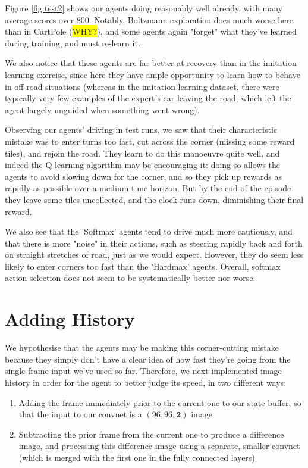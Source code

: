 \documentclass[a4paper, 11pt, conference]{ieeeconf}      %
\begin{document}
Figure \ref{fig:test2} shows our agents doing reasonably well already, with many average scores over 800. Notably, Boltzmann exploration does much worse here than in CartPole (\colorbox{yellow}{WHY?}), and some agents again "forget" what they've learned during training, and must re-learn it.

We also notice that these agents are far better at recovery than in the imitation learning exercise, since here they have ample opportunity to learn how to behave in off-road situations (whereas in the imitation learning dataset, there were typically very few examples of the expert's car leaving the road, which left the agent largely unguided when something went wrong).

Observing our agents' driving in test runs, we saw that their characteristic mistake was to enter turns too fast, cut across the corner (missing some reward tiles), and rejoin the road. They learn to do this manoeuvre quite well, and indeed the Q learning algorithm may be encouraging it: doing so allows the agents to avoid slowing down for the corner, and so they pick up rewards as rapidly as possible over a medium time horizon. But by the end of the episode they leave some tiles uncollected, and the clock runs down, diminishing their final reward.

We also see that the 'Softmax' agents tend to drive much more cautiously, and that there is more "noise" in their actions, such as steering rapidly back and forth on straight stretches of road, just as we would expect. However, they do seem less likely to enter corners too fast than the 'Hardmax' agents. Overall, softmax action selection does not seem to be systematically better nor worse.

\section{Adding History}

We hypothesise that the agents may be making this corner-cutting mistake because they simply don't have a clear idea of how fast they're going from the single-frame input we've used so far. Therefore, we next implemented image history in order for the agent to better judge its speed, in two different ways:

\begin{enumerate}
	\item Adding the frame immediately prior to the current one to our state buffer, so that the input to our convnet is a $(96, 96, \textbf{2})$ image
	
	\item Subtracting the prior frame from the current one to produce a difference image, and processing this difference image using a separate, smaller convnet (which is merged with the first one in the fully connected layers)
\end{enumerate}
\end{document}

